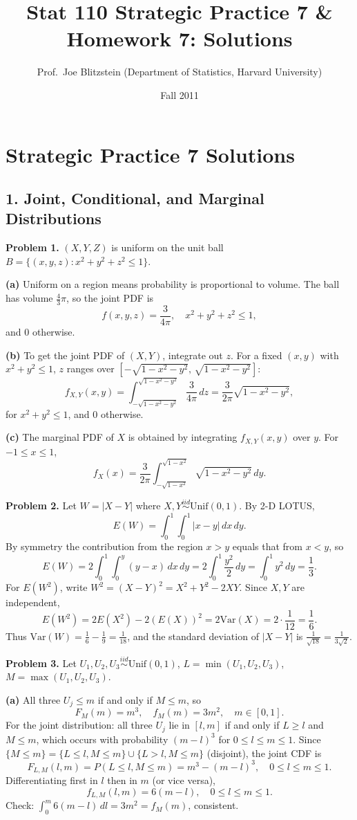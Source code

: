 \documentclass{article}
\title{Stat 110 Strategic Practice 7 \& Homework 7: Solutions}
\author{Prof.\ Joe Blitzstein (Department of Statistics, Harvard University)}
\date{Fall 2011}
\begin{document}
\maketitle

\section*{Strategic Practice 7 Solutions}

\subsection*{1. Joint, Conditional, and Marginal Distributions}

\textbf{Problem 1.} $(X,Y,Z)$ is uniform on the unit ball $B = \{(x,y,z): x^2+y^2+z^2\le 1\}$.

\textbf{(a)} Uniform on a region means probability is proportional to volume. The ball has volume $\frac{4}{3}\pi$, so the joint PDF is
$$
f(x,y,z) = \frac{3}{4\pi}, \quad x^2+y^2+z^2\le 1,
$$
and $0$ otherwise.

\textbf{(b)} To get the joint PDF of $(X,Y)$, integrate out $z$. For a fixed $(x,y)$ with $x^2+y^2\le1$, $z$ ranges over $[-\sqrt{1-x^2-y^2},\,\sqrt{1-x^2-y^2}]$:
$$
f_{X,Y}(x,y) = \int_{-\sqrt{1-x^2-y^2}}^{\sqrt{1-x^2-y^2}}\frac{3}{4\pi}\,dz = \frac{3}{2\pi}\sqrt{1-x^2-y^2},
$$
for $x^2+y^2\le1$, and $0$ otherwise.

\textbf{(c)} The marginal PDF of $X$ is obtained by integrating $f_{X,Y}(x,y)$ over $y$. For $-1\le x\le 1$,
$$
f_X(x) = \frac{3}{2\pi}\int_{-\sqrt{1-x^2}}^{\sqrt{1-x^2}}\sqrt{1-x^2-y^2}\,dy.
$$

\bigskip
\textbf{Problem 2.} Let $W = |X-Y|$ where $X,Y\overset{iid}{\sim}\text{Unif}(0,1)$. By 2-D LOTUS,
$$
E(W) = \int_0^1\int_0^1|x-y|\,dx\,dy.
$$
By symmetry the contribution from the region $x>y$ equals that from $x<y$, so
$$
E(W) = 2\int_0^1\int_0^y(y-x)\,dx\,dy = 2\int_0^1\frac{y^2}{2}\,dy = \int_0^1 y^2\,dy = \frac{1}{3}.
$$
For $E(W^2)$, write $W^2=(X-Y)^2 = X^2+Y^2-2XY$. Since $X,Y$ are independent,
$$
E(W^2) = 2E(X^2) - 2(E(X))^2 = 2\text{Var}(X) = 2\cdot\frac{1}{12} = \frac{1}{6}.
$$
Thus $\text{Var}(W) = \frac{1}{6}-\frac{1}{9} = \frac{1}{18}$, and the standard deviation of $|X-Y|$ is $\frac{1}{\sqrt{18}} = \frac{1}{3\sqrt{2}}$.

\bigskip
\textbf{Problem 3.} Let $U_1,U_2,U_3\overset{iid}{\sim}\text{Unif}(0,1)$, $L=\min(U_1,U_2,U_3)$, $M=\max(U_1,U_2,U_3)$.

\textbf{(a)} All three $U_j\le m$ if and only if $M\le m$, so
$$
F_M(m) = m^3, \quad f_M(m) = 3m^2, \quad m\in[0,1].
$$
For the joint distribution: all three $U_j$ lie in $[l,m]$ if and only if $L\ge l$ and $M\le m$, which occurs with probability $(m-l)^3$ for $0\le l\le m\le1$. Since $\{M\le m\} = \{L\le l,M\le m\}\cup\{L>l,M\le m\}$ (disjoint), the joint CDF is
$$
F_{L,M}(l,m) = P(L\le l, M\le m) = m^3 - (m-l)^3, \quad 0\le l\le m\le 1.
$$
Differentiating first in $l$ then in $m$ (or vice versa),
$$
f_{L,M}(l,m) = 6(m-l), \quad 0\le l\le m\le1.
$$
Check: $\int_0^m 6(m-l)\,dl = 3m^2 = f_M(m)$, consistent.
\end{document}
